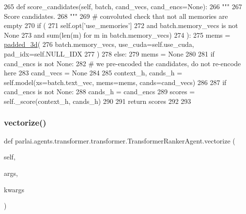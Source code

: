 \begin{DoxyCode}
265     \textcolor{keyword}{def }score\_candidates(self, batch, cand\_vecs, cand\_encs=None):
266         \textcolor{stringliteral}{"""}
267 \textcolor{stringliteral}{        Score candidates.}
268 \textcolor{stringliteral}{        """}
269         \textcolor{comment}{# convoluted check that not all memories are empty}
270         \textcolor{keywordflow}{if} (
271             self.opt[\textcolor{stringliteral}{'use\_memories'}]
272             \textcolor{keywordflow}{and} batch.memory\_vecs \textcolor{keywordflow}{is} \textcolor{keywordflow}{not} \textcolor{keywordtype}{None}
273             \textcolor{keywordflow}{and} sum(len(m) \textcolor{keywordflow}{for} m \textcolor{keywordflow}{in} batch.memory\_vecs)
274         ):
275             mems = \hyperlink{namespaceparlai_1_1utils_1_1torch_a1494906187c1ba19f92defb0d4c19ffe}{padded\_3d}(
276                 batch.memory\_vecs, use\_cuda=self.use\_cuda, pad\_idx=self.NULL\_IDX
277             )
278         \textcolor{keywordflow}{else}:
279             mems = \textcolor{keywordtype}{None}
280 
281         \textcolor{keywordflow}{if} cand\_encs \textcolor{keywordflow}{is} \textcolor{keywordflow}{not} \textcolor{keywordtype}{None}:
282             \textcolor{comment}{# we pre-encoded the candidates, do not re-encode here}
283             cand\_vecs = \textcolor{keywordtype}{None}
284 
285         context\_h, cands\_h = self.model(xs=batch.text\_vec, mems=mems, cands=cand\_vecs)
286 
287         \textcolor{keywordflow}{if} cand\_encs \textcolor{keywordflow}{is} \textcolor{keywordflow}{not} \textcolor{keywordtype}{None}:
288             cands\_h = cand\_encs
289         scores = self.\_score(context\_h, cands\_h)
290 
291         \textcolor{keywordflow}{return} scores
292 
293 
\end{DoxyCode}
\mbox{\label{classparlai_1_1agents_1_1transformer_1_1transformer_1_1TransformerRankerAgent_a76ba1a57647f32877fce85a064952c5d}} 
\subsubsection{\texorpdfstring{vectorize()}{vectorize()}}
{\footnotesize\ttfamily def parlai.\+agents.\+transformer.\+transformer.\+Transformer\+Ranker\+Agent.\+vectorize (\begin{DoxyParamCaption}\item[{}]{self,  }\item[{}]{args,  }\item[{}]{kwargs }\end{DoxyParamCaption})}

